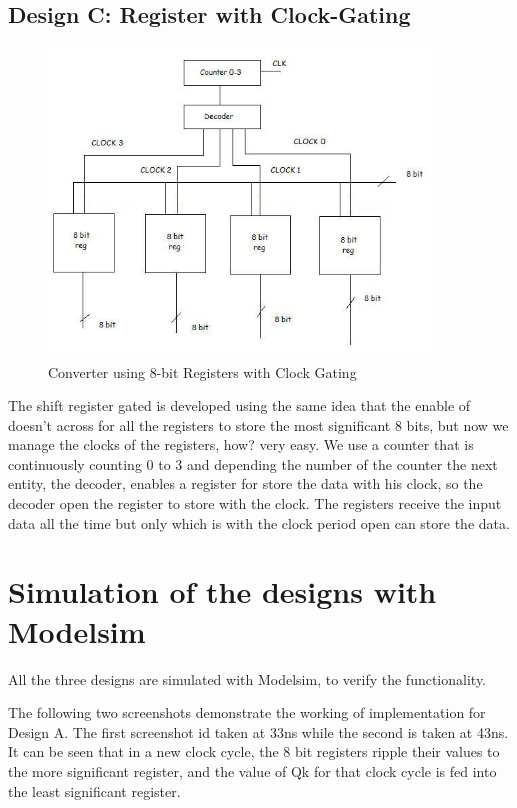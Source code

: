 \documentclass[11pt,a4paper]{article}
\begin{document}
\newpage

\subsection{Design C: Register with Clock-Gating}


\begin{figure}[htp]
\centering
\includegraphics[width = 4in]{./images/shiftregistergated.jpg}
\caption{Converter using 8-bit Registers with Clock Gating}
\end{figure}

The shift register gated is developed using the same idea that the enable of doesn't across for all the registers to store the most significant 8 bits, but now we manage the clocks of the registers, how? very easy. We use a counter that is continuously counting 0 to 3 and depending the number of the counter the next entity, the decoder, enables a register for store the data with his clock, so the decoder open the register to store with the clock. The registers receive the input data all the time but only which is with the clock period open can store the data.


\newpage
\section{Simulation of the designs with Modelsim}
\label{section:simulation}
All the three designs are simulated with Modelsim, to verify the functionality.
 
The following two screenshots demonstrate the working of implementation for Design A. The first screenshot id taken at 33ns while the second is taken at 43ns. It can be seen that in a new clock cycle, the 8 bit registers ripple their values to the more significant register, and the value of Qk for that clock cycle is fed into the least significant register.
\end{document}
